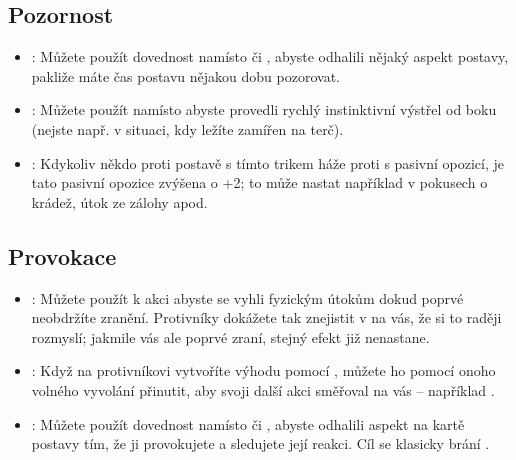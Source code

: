 \documentclass[../main.tex]{subfiles}
\begin{document}
\subsection{Pozornost}
\label{sec:trik-pozornost}
\begin{itemize}

\item{}:
\label{sec:pozornost-ctenar}
Můžete použít dovednost  namísto  či , abyste odhalili nějaký aspekt postavy, pakliže máte čas postavu nějakou dobu pozorovat.

\item{}:
\label{sec:pozornost-strelba}
Můžete použít  namísto  abyste provedli rychlý instinktivní výstřel od boku (nejste např. v situaci, kdy ležíte zamířen na terč).

\item{}:
\label{sec:pozornost-smysl}
Kdykoliv někdo proti postavě s tímto trikem háže proti  s pasivní opozicí, je tato pasivní opozice zvýšena o +2; to může nastat například v pokusech o krádež, útok ze zálohy apod.
\end{itemize}




\subsection{Provokace}
\label{sec:trik-provokace}
\begin{itemize}
  
\item{}:
\label{sec:provokace-zbroj}
Můžete použít  k akci  abyste se vyhli fyzickým útokům dokud poprvé neobdržíte zranění. Protivníky dokážete tak znejistit v  na vás, že si to raději rozmyslí; jakmile vás ale poprvé zraní, stejný efekt již nenastane.

\item{}:
\label{sec:provokace-cos}
Když na protivníkovi vytvoříte výhodu pomocí , můžete ho pomocí onoho volného vyvolání přinutit, aby svoji další akci směřoval na vás – například .

\item{}:
\label{sec:provokace-stourani}
Můžete použít dovednost  namísto  či , abyste odhalili aspekt na kartě postavy tím, že ji provokujete a sledujete její reakci. Cíl se klasicky brání .
\end{itemize}
\end{document}
